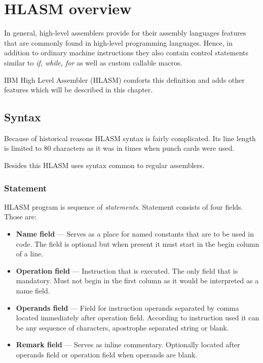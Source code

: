 \chapter{HLASM overview}

In general, high-level assemblers provide for their assembly languages features that are commonly found in high-level programming languages. Hence, in addition to ordinary machine instructions they also contain control statements similar to \textit{if, while, for} as well as custom callable macros.

IBM High Level Assembler (HLASM) comforts this definition and adds other features which will be described in this chapter.

\section{Syntax}

Because of historical reasons HLASM syntax is fairly complicated. Its line length is limited to 80 characters as it was in times when punch cards were used. 

Besides this HLASM uses syntax common to regular assemblers.

\subsection{Statement}

HLASM program is sequence of \textit{statements}. Statement consists of four fields. Those are:
\begin{itemize}
	\item \textbf{Name field} --- Serves as a place for named constants that are to be used in code. The field is optional but when present it must start in the begin column of a line.
	
	\item \textbf{Operation field} --- Instruction that is executed. The only field that is mandatory. Must not begin in the first column as it would be interpreted as a name field.
	
	\item \textbf{Operands field} --- Field for instruction operands separated by comma located immediately after operation field. According to instruction used it can be any sequence of characters, apostrophe separated string or blank. 
	
	\item \textbf{Remark field} --- Serves as inline commentary. Optionally located after operands field or operation field when operands are blank.
\end{itemize}

